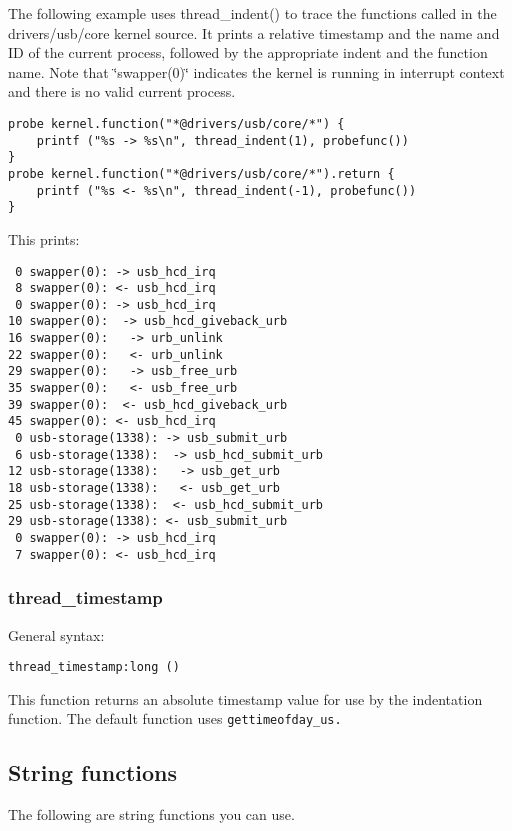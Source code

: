 \documentclass[twoside,english]{article}
\newenvironment{vindent}
{\begin{list}{}{\setlength{\listparindent}{6pt}}
\item[]}
{\end{list}}
\begin{document}
The following example uses thread\_indent() to trace the functions called
in the drivers/usb/core kernel source. It prints a relative timestamp and
the name and ID of the current process, followed by the appropriate indent
and the function name. Note that \char`\"{}swapper(0)\char`\"{} indicates
the kernel is running in interrupt context and there is no valid current
process.

\begin{vindent}
\begin{verbatim}
probe kernel.function("*@drivers/usb/core/*") {
    printf ("%s -> %s\n", thread_indent(1), probefunc())
}
probe kernel.function("*@drivers/usb/core/*").return {
    printf ("%s <- %s\n", thread_indent(-1), probefunc())
}
\end{verbatim}
\end{vindent}
This prints:

\begin{vindent}
\begin{verbatim}
 0 swapper(0): -> usb_hcd_irq
 8 swapper(0): <- usb_hcd_irq
 0 swapper(0): -> usb_hcd_irq
10 swapper(0):  -> usb_hcd_giveback_urb
16 swapper(0):   -> urb_unlink
22 swapper(0):   <- urb_unlink
29 swapper(0):   -> usb_free_urb
35 swapper(0):   <- usb_free_urb
39 swapper(0):  <- usb_hcd_giveback_urb
45 swapper(0): <- usb_hcd_irq
 0 usb-storage(1338): -> usb_submit_urb
 6 usb-storage(1338):  -> usb_hcd_submit_urb
12 usb-storage(1338):   -> usb_get_urb
18 usb-storage(1338):   <- usb_get_urb
25 usb-storage(1338):  <- usb_hcd_submit_urb
29 usb-storage(1338): <- usb_submit_urb
 0 swapper(0): -> usb_hcd_irq
 7 swapper(0): <- usb_hcd_irq
\end{verbatim}
\end{vindent}

\subsubsection{thread\_timestamp}

General syntax:

\begin{vindent}
\begin{verbatim}
thread_timestamp:long ()
\end{verbatim}
\end{vindent}
This function returns an absolute timestamp value for use by the indentation
function. The default function uses \texttt{gettimeofday\_us.}


\subsection{String functions}
The following are string functions you can use.
\end{document}
